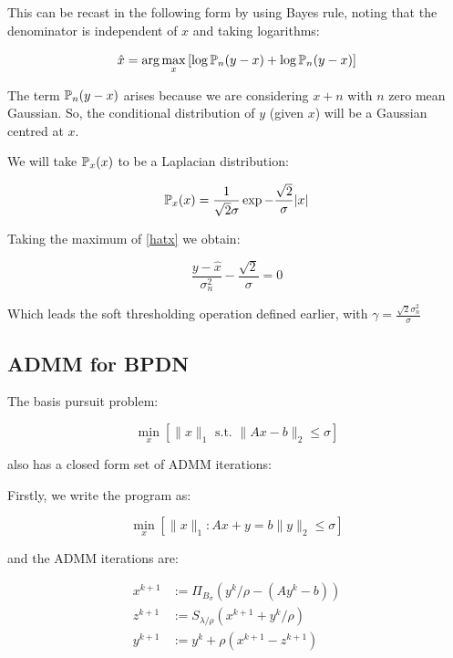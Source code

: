 \documentclass{article}
\begin{document}
This can be recast in the following form by using Bayes rule, noting that the denominator is independent of \(x\) and taking logarithms:

\begin{equation}
\hat{x} = \arg\max_x \left[\log{{\mathbb{P}}_{n}{\left(y-x\right)}}+\log{{\mathbb{P}}_{n}{\left(y-x\right)}}\right]
\label{hatx}
\end{equation}

The term \({\mathbb{P}}_{n}{\left(y-x\right)}\) arises because we are considering \(x+n\) with \(n\) zero mean Gaussian. So, the conditional distribution of \(y\) (given \(x\)) will be a Gaussian centred at \(x\).

We will take \({\mathbb{P}}_{x}{\left(x\right)}\) to be a Laplacian distribution:

\begin{equation}
{\mathbb{P}}_x{\left(x\right)} = \frac{1}{\sqrt{2}\sigma}\exp{-\frac{\sqrt{2}}{\sigma}|x|}
\end{equation}

Taking the maximum of \ref{hatx} we obtain:

\begin{equation}
\frac{y-\hat{x}}{\sigma^2_n}-\frac{\sqrt{2}}{\sigma} = 0
\end{equation}

Which leads the soft thresholding operation defined earlier, with \(\gamma = \frac{\sqrt{2}\sigma^2_n}{\sigma}\)

\subsection{ADMM for BPDN}
The basis pursuit problem:

\begin{equation}
\min_x \left[\|x\|_1 \text{ s.t. } \|Ax-b\|_2 \leq \sigma\right]
\end{equation}

also has a closed form set of ADMM iterations:

Firstly, we write the program as:

\begin{equation}
\min_x \left[\|x\|_1 : Ax+y = b \|y\|_2 \leq \sigma \right]
\end{equation}

and the ADMM iterations are:

\begin{align}
x^{k+1} &:= \Pi_{B_\sigma}\left(y^k / \rho - \left( Ay^k - b\right) \right)\\
z^{k+1} &:= S_{\lambda/\rho}\left(x^{k+1} + y^k/\rho\right)
 \\
y^{k+1} &:= y^{k} + \rho \left(x^{k+1}-z^{k+1}\right)
\label{admm_algo_bpdn}
\end{align}
\end{document}

